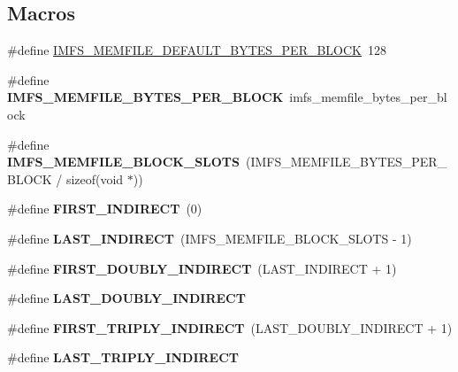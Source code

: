 \subsection*{Macros}
\begin{DoxyCompactItemize}
\item 
\#define \mbox{\hyperlink{group__IMFS_gae516a81a3c6a2b16c5063c2885be9dc5}{I\+M\+F\+S\+\_\+\+M\+E\+M\+F\+I\+L\+E\+\_\+\+D\+E\+F\+A\+U\+L\+T\+\_\+\+B\+Y\+T\+E\+S\+\_\+\+P\+E\+R\+\_\+\+B\+L\+O\+CK}}~128
\item 
\mbox{\label{group__IMFS_gafcb3652f6e6d258d15d4fe3ca2bb98ae}} 
\#define {\bfseries I\+M\+F\+S\+\_\+\+M\+E\+M\+F\+I\+L\+E\+\_\+\+B\+Y\+T\+E\+S\+\_\+\+P\+E\+R\+\_\+\+B\+L\+O\+CK}~imfs\+\_\+memfile\+\_\+bytes\+\_\+per\+\_\+block
\item 
\mbox{\label{group__IMFS_ga468e4dbe1ac2235f63678f045434df42}} 
\#define {\bfseries I\+M\+F\+S\+\_\+\+M\+E\+M\+F\+I\+L\+E\+\_\+\+B\+L\+O\+C\+K\+\_\+\+S\+L\+O\+TS}~(I\+M\+F\+S\+\_\+\+M\+E\+M\+F\+I\+L\+E\+\_\+\+B\+Y\+T\+E\+S\+\_\+\+P\+E\+R\+\_\+\+B\+L\+O\+CK / sizeof(void $\ast$))
\item 
\mbox{\label{group__IMFS_gacc6e2053b0da7fa69b5c7dcc0973c69e}} 
\#define {\bfseries F\+I\+R\+S\+T\+\_\+\+I\+N\+D\+I\+R\+E\+CT}~(0)
\item 
\mbox{\label{group__IMFS_ga0624af9ecc9e94cbc4a48e5aaa983e7f}} 
\#define {\bfseries L\+A\+S\+T\+\_\+\+I\+N\+D\+I\+R\+E\+CT}~(I\+M\+F\+S\+\_\+\+M\+E\+M\+F\+I\+L\+E\+\_\+\+B\+L\+O\+C\+K\+\_\+\+S\+L\+O\+TS -\/ 1)
\item 
\mbox{\label{group__IMFS_ga3bac8bac101fa0646bd16b947e208990}} 
\#define {\bfseries F\+I\+R\+S\+T\+\_\+\+D\+O\+U\+B\+L\+Y\+\_\+\+I\+N\+D\+I\+R\+E\+CT}~(L\+A\+S\+T\+\_\+\+I\+N\+D\+I\+R\+E\+CT + 1)
\item 
\#define {\bfseries L\+A\+S\+T\+\_\+\+D\+O\+U\+B\+L\+Y\+\_\+\+I\+N\+D\+I\+R\+E\+CT}
\item 
\mbox{\label{group__IMFS_ga0970b16d5b605afb48f7e608258f97d4}} 
\#define {\bfseries F\+I\+R\+S\+T\+\_\+\+T\+R\+I\+P\+L\+Y\+\_\+\+I\+N\+D\+I\+R\+E\+CT}~(L\+A\+S\+T\+\_\+\+D\+O\+U\+B\+L\+Y\+\_\+\+I\+N\+D\+I\+R\+E\+CT + 1)
\item 
\#define {\bfseries L\+A\+S\+T\+\_\+\+T\+R\+I\+P\+L\+Y\+\_\+\+I\+N\+D\+I\+R\+E\+CT}

\end{DoxyCompactItemize}
